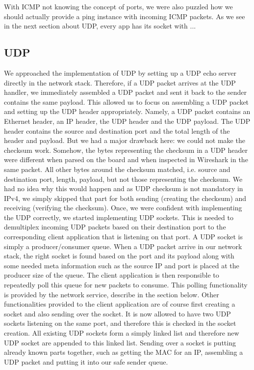 With ICMP not knowing the concept of ports, we were also puzzled how we should actually provide a ping instance with incoming ICMP packets. As we see in the next section about UDP, every app has its socket with  ...


\subsection{UDP}

We approached the implementation of UDP by setting up a UDP echo server directly in the network stack. Therefore, if a UDP packet arrives at the UDP handler, we immediately assembled a UDP packet and sent it back to the sender contains the same payload. This allowed us to focus on assembling a UDP packet and setting up the UDP header appropriately. Namely, a UDP packet contains an Ethernet header, an IP header, the UDP header and the UDP payload. The UDP header contains the source and destination port and the total length of the header and payload.
But we had a major drawback here: we could not make the checksum work. Somehow, the bytes representing the checksum in a UDP header were different when parsed on the board and when inspected in Wireshark in the same packet. All other bytes around the checksum matched, i.e. source and destination port, length, payload, but not those representing the checksum. We had no idea why this would happen and as UDP checksum is not mandatory in IPv4, we simply skipped that part for both sending (creating the checksum) and receiving (verifying the checksum).
Once, we were confident with implementing the UDP correctly, we started implementing UDP sockets. This is needed to demultiplex incoming UDP packets based on their destination port to the corresponding client application that is listening on that port.
A UDP socket is simply a producer/consumer queue. When a UDP packet arrive in our network stack, the right socket is found based on the port and its payload along with some needed meta information such as the source IP and port is placed at the producer size of the queue. The client application is then responsible to repeatedly poll this queue for new packets to consume. This polling functionality is provided by the network service, describe in the section below.
Other functionalities provided to the client application are of course first creating a socket and also sending over the socket. It is now allowed to have two UDP sockets listening on the same port, and therefore this is checked in the socket creation. All existing UDP sockets form a simply linked list and therefore new UDP socket are appended to this linked list. Sending over a socket is putting already known parts together, such as getting the MAC for an IP, assembling a UDP packet and putting it into our safe sender queue.

